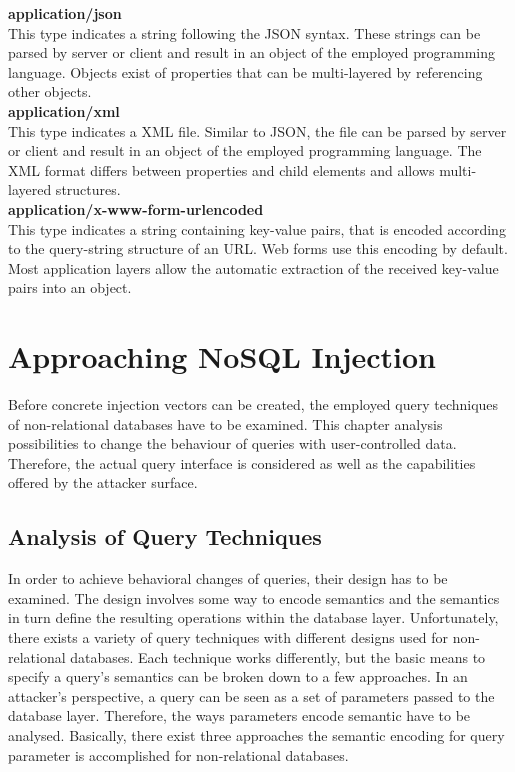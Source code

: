 \textbf{application/json} \\
This type indicates a string following the JSON syntax. These strings can be parsed by server or client and result in an object of the employed programming language. Objects exist of properties that can be multi-layered by referencing other objects. \\

\textbf{application/xml} \\
This type indicates a XML file. Similar to JSON, the file can be parsed by server or client and result in an object of the employed programming language. The XML format differs between properties and child elements and allows multi-layered structures.\\

\textbf{application/x-www-form-urlencoded} \\
This type indicates a string containing key-value pairs, that is encoded according to the query-string structure of an URL. Web forms use this encoding by default. Most application layers allow the automatic extraction of the received key-value pairs into an object.

\chapter{Approaching NoSQL Injection}
Before concrete injection vectors can be created, the employed query techniques of non-relational databases have to be examined. This chapter analysis possibilities to change the behaviour of queries with user-controlled data. Therefore, the actual query interface is considered as well as the capabilities offered by the attacker surface.

\section{Analysis of Query Techniques}
\label{sec:analysisOfQueryTechniques}
In order to achieve behavioral changes of queries, their design has to be examined. The design involves some way to encode semantics and the semantics in turn define the resulting operations within the database layer. Unfortunately, there exists a variety of query techniques with different designs used for non-relational databases. Each technique works differently, but the basic means to specify a query's semantics can be broken down to a few approaches. In an attacker's perspective, a query can be seen as a set of parameters passed to the database layer. Therefore, the ways parameters encode semantic have to be analysed. Basically, there exist three approaches the semantic encoding for query parameter is accomplished for non-relational databases.\\

